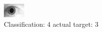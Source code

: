 \begin{figure}[h!]
\begin{center}
\includegraphics[width=0.60\columnwidth]{figures/ID1841_class_4_target_3.png}
\end{center}
\caption{ Classification: 4 actual target: 3}
\label{fig:ID1841_class_4_target_3}
\end{figure}
